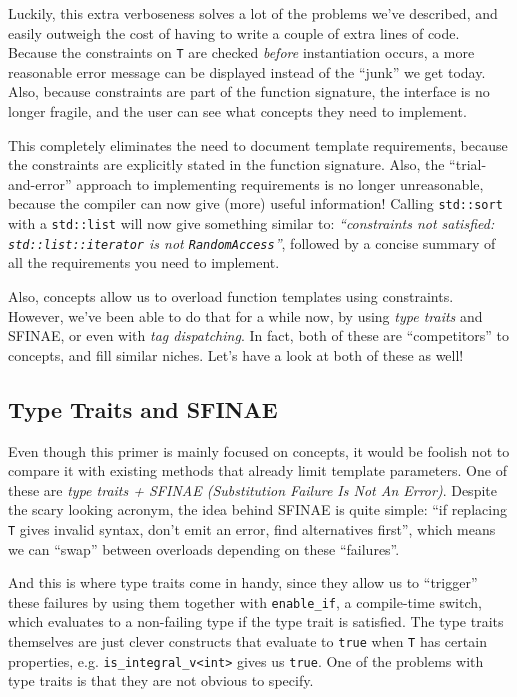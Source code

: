     Luckily, this extra verboseness solves a lot of the problems we've described, and easily outweigh the cost of having to write a couple of extra lines of code. Because the constraints on \texttt{T} are checked \emph{before} instantiation occurs, a more reasonable error message can be displayed instead of the ``junk'' we get today. Also, because constraints are part of the function signature, the interface is no longer fragile, and the user can see what concepts they need to implement.

    This completely eliminates the need to document template requirements, because the constraints are explicitly stated in the function signature. Also, the ``trial-and-error'' approach to implementing requirements is no longer unreasonable, because the compiler can now give (more) useful information! Calling \texttt{std::sort} with a \texttt{std::list} will now give something similar to: \emph{``constraints not satisfied: \texttt{std::list::iterator} is not \texttt{RandomAccess}''}, followed by a concise summary of all the requirements you need to implement.

    Also, concepts allow us to overload function templates using constraints. However, we've been able to do that for a while now, by using \emph{type traits} and SFINAE, or even with \emph{tag dispatching}. In fact, both of these are ``competitors'' to concepts, and fill similar niches. Let's have a look at both of these as well!

\subsection{Type Traits and SFINAE} \label{sec:type_traits_and_sfinae}

    Even though this primer is mainly focused on concepts, it would be foolish not to compare it with existing methods that already limit template parameters. One of these are \emph{type traits + SFINAE (Substitution Failure Is Not An Error)}. Despite the scary looking acronym, the idea behind SFINAE is quite simple: ``if replacing \texttt{T} gives invalid syntax, don't emit an error, find alternatives first'', which means we can ``swap'' between overloads depending on these ``failures''.

    And this is where type traits come in handy, since they allow us to ``trigger'' these failures by using them together with \texttt{enable\_if}, a compile-time switch, which evaluates to a non-failing type if the type trait is satisfied. The type traits themselves are just clever constructs that evaluate to \texttt{true} when \texttt{T} has certain properties, e.g. \texttt{is\_integral\_v<int>} gives us \texttt{true}. One of the problems with type traits is that they are not obvious to specify.

